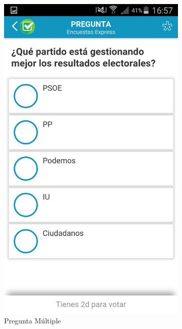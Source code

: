 \begin{figure}[H]
\begin{subfigure}[b]{0.3\textwidth}
                \includegraphics[width=\textwidth]{Media/Captures/appgreeQuestion.jpg}
                \caption{Pregunta Múltiple}
                \label{fig:appgreeQuestion}
        \end{subfigure}
        ~
        \begin{subfigure}[b]{0.3\textwidth}

\end{subfigure}
\end{figure}
